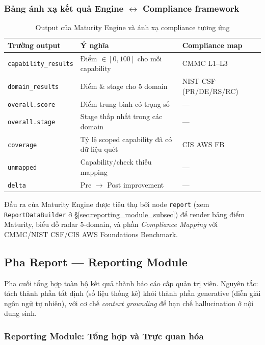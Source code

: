 \subsubsection*{Bảng ánh xạ kết quả Engine $\leftrightarrow$ Compliance framework}
\begin{table}[!htb]
  \centering
  \caption{Output của Maturity Engine và ánh xạ compliance tương ứng}
  \label{tab:maturity_outputs}
  \begin{tabular}{|l|p{6cm}|l|}
    \hline
    \textbf{Trường output} & \textbf{Ý nghĩa} & \textbf{Compliance map} \\ \hline
    \texttt{capability\_results} & Điểm $\in [0,100]$ cho mỗi capability & CMMC L1--L3 \\ \hline
    \texttt{domain\_results} & Điểm \& stage cho 5 domain & NIST CSF (PR/DE/RS/RC) \\ \hline
    \texttt{overall.score} & Điểm trung bình có trọng số & --- \\ \hline
    \texttt{overall.stage} & Stage thấp nhất trong các domain & --- \\ \hline
    \texttt{coverage} & Tỷ lệ scoped capability đã có dữ liệu quét & CIS AWS FB \\ \hline
    \texttt{unmapped} & Capability/check thiếu mapping & --- \\ \hline
    \texttt{delta} & Pre $\rightarrow$ Post improvement & --- \\ \hline
  \end{tabular}
\end{table}

Đầu ra của Maturity Engine được tiêu thụ bởi node \texttt{report} (xem \texttt{ReportDataBuilder} ở §\ref{sec:reporting_module_subsec}) để render bảng điểm Maturity, biểu đồ radar 5-domain, và phần \textit{Compliance Mapping} với CMMC/NIST CSF/CIS AWS Foundations Benchmark.

\subsection{Pha Report --- Reporting Module}
\label{sec:phase_report}

Pha cuối tổng hợp toàn bộ kết quả thành báo cáo cấp quản trị viên. Nguyên tắc: tách thành phần tất định (số liệu thống kê) khỏi thành phần generative (diễn giải ngôn ngữ tự nhiên), với cơ chế \textit{context grounding} để hạn chế hallucination ở nội dung sinh.

\subsubsection*{Reporting Module: Tổng hợp và Trực quan hóa}
\label{sec:reporting_module_subsec}

